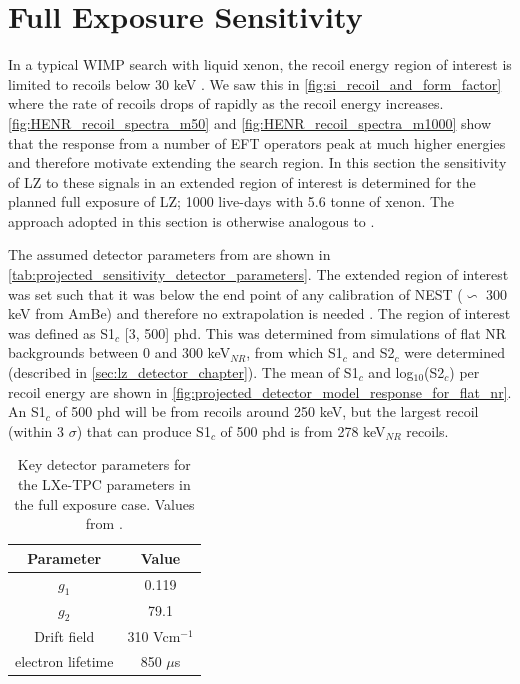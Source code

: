 \section{Full Exposure Sensitivity}
\par
In a typical WIMP search with liquid xenon, the recoil energy region of interest is limited to recoils below 30 keV \cite{LZ_TechnicalDesignReview_ref, LZ_projected_sensitivity_paper_ref, xenonnt_projected_sensitivty_ref}.
We saw this in \autoref{fig:si_recoil_and_form_factor} where the rate of recoils drops of rapidly as the recoil energy increases.
\autoref{fig:HENR_recoil_spectra_m50} and \autoref{fig:HENR_recoil_spectra_m1000} show that the response from a number of EFT operators peak at much higher energies and therefore motivate extending the search region.
In this section the sensitivity of LZ to these signals in an extended region of interest is determined for the planned full exposure of LZ; 1000 live-days with 5.6 tonne of xenon.
The approach adopted in this section is otherwise analogous to \cite{LZ_projected_sensitivity_paper_ref}.
\par
The assumed detector parameters from \cite{LZ_projected_sensitivity_paper_ref} are shown in \autoref{tab:projected_sensitivity_detector_parameters}.
The extended region of interest was set such that it was below the end point of any calibration of NEST ($\backsim$ 300 keV from AmBe) and therefore no extrapolation is needed \cite{nest_1_ref}.
The region of interest was defined as S1$_c$ [3, 500] phd.
This was determined from simulations of flat NR backgrounds between 0 and 300 keV$_{NR}$, from which S1$_c$ and S2$_c$ were determined (described in \autoref{sec:lz_detector_chapter}).
The mean of S1$_c$ and log$_{10}$(S2$_c$) per recoil energy are shown in \autoref{fig:projected_detector_model_response_for_flat_nr}.
An S1$_c$ of 500 phd will be from recoils around 250 keV, but the largest recoil (within 3 $\sigma$) that can produce S1$_c$ of 500 phd is from 278 keV$_{NR}$ recoils.

\begin{table}[]
    \centering
    \begin{tabular}{c|c}
        Parameter   & Value  \\ \hline
        $g_{1}$     & 0.119 \\
        $g_{2}$     & 79.1  \\
        Drift field & 310 Vcm$^{-1}$ \\
        electron lifetime & 850 $\mu$s
    \end{tabular}
    \caption{Key detector parameters for the LXe-TPC parameters in the full exposure case. 
             Values from \cite{LZ_projected_sensitivity_paper_ref}.}
    \label{tab:projected_sensitivity_detector_parameters}
\end{table}


